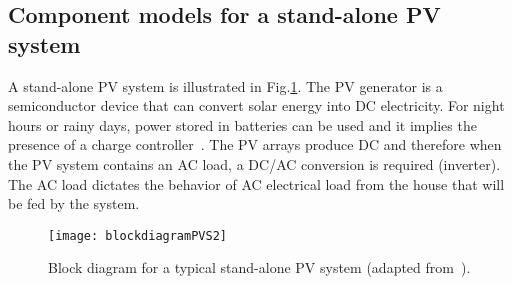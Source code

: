 %
\subsection{Component models for a stand-alone PV system }
A stand-alone PV system is illustrated in Fig.\ref{fig:blockdiagram}. The PV generator is a semiconductor device that can convert solar energy into DC electricity. %
For night hours or rainy days, power stored in batteries can be used and it implies the presence of a charge controller~\cite{Hansen}. The PV arrays produce DC and therefore when the PV system contains an AC load, a DC/AC conversion is required (inverter). The AC load dictates the behavior of AC electrical load from the house that will be fed by the system.
%
%
\begin{figure}[h]
\texttt{[image: blockdiagramPVS2]}
\centering
\caption{Block diagram for a typical stand-alone PV system (adapted from~\cite{Hansen}).}
\label{fig:blockdiagram}
\end{figure}
%

